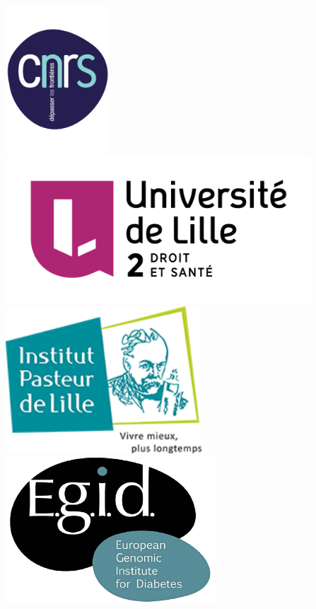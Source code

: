 \documentclass[10pt,a0,portrait]{a0poster}
\begin{document}
\begin{center}
    \vfill
    {\includegraphics[height=5.5cm, keepaspectratio]{../UTILS/Logos/logo_cnrs.pdf}
    \hspace{11cm} \includegraphics[height=5.5cm, keepaspectratio]{../UTILS/Logos/UL2-WEB-2014.png}
    \hspace{8cm} \includegraphics[height=5.5cm, keepaspectratio]{../UTILS/Logos/Institut-Pasteur-de-Lille.png}
    \hspace{11cm} \includegraphics[height=5.5cm, keepaspectratio]{../UTILS/Logos/logo_egid.pdf}}
\end{center}


\end{document}
